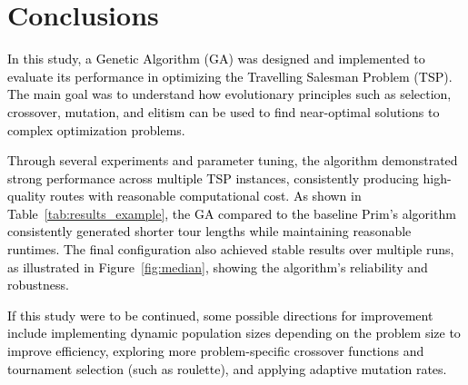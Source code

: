 \documentclass{scrartcl}
\begin{document}
\section{Conclusions}
\label{sec:conclusions}

\textcolor{black}{In this study, a Genetic Algorithm (GA) was designed and implemented to evaluate its performance in optimizing the Travelling Salesman Problem (TSP). The main goal was to understand how evolutionary principles such as selection, crossover, mutation, and elitism can be used to find near-optimal solutions to complex optimization problems.}

\textcolor{black}{Through several experiments and parameter tuning, the algorithm demonstrated strong performance across multiple TSP instances, consistently producing high-quality routes with reasonable computational cost. As shown in Table~\ref{tab:results_example}, the GA compared to the baseline Prim’s algorithm consistently generated shorter tour lengths while maintaining reasonable runtimes. The final configuration also achieved stable results over multiple runs, as illustrated in Figure~\ref{fig:median}, showing the algorithm's reliability and robustness.}

\textcolor{black}{If this study were to be continued, some possible directions for improvement include implementing dynamic population sizes depending on the problem size to improve efficiency, exploring more problem-specific crossover functions and tournament selection (such as roulette), and applying adaptive mutation rates.}



\end{document}
